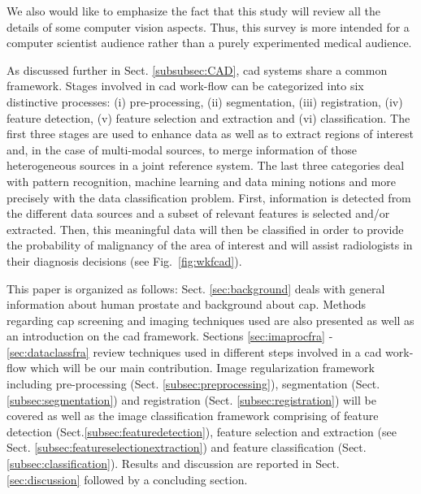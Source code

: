 {\color{red}We also would like to emphasize the fact that this study will review all the details of some computer vision aspects. Thus, this survey is more intended for a computer scientist audience rather than a purely experimented medical audience.}

As discussed further in Sect. \ref{subsubsec:CAD}, \acs{cad} systems share a common framework. Stages involved in \acs{cad} work-flow can be categorized into six distinctive processes: (i) pre-processing, (ii) segmentation, (iii) registration, (iv) feature detection, (v) feature selection and extraction and (vi) classification. The first three stages are used to enhance data as well as to extract regions of interest and, in the case of multi-modal sources, to merge information of those heterogeneous sources in a joint reference system. The last three categories deal with pattern recognition, machine learning and data mining notions and more precisely with the data classification problem. First, information is detected from the different data sources and a subset of relevant features is selected and/or extracted. Then, this meaningful data will then be classified in order to provide the probability of malignancy of the area of interest and will assist radiologists in their diagnosis decisions (see Fig.~\ref{fig:wkfcad}).

This paper is organized as follows: Sect. \ref{sec:background} deals with general information about human prostate and background about \ac{cap}. Methods regarding \ac{cap} screening and imaging techniques used are also presented as well as an introduction on the \acs{cad} framework. Sections \ref{sec:imaprocfra} - \ref{sec:dataclassfra} review techniques used in different steps involved in a \acs{cad} work-flow which will be our main contribution. Image regularization framework including pre-processing (Sect. \ref{subsec:preprocessing}), segmentation (Sect. \ref{subsec:segmentation}) and registration (Sect. \ref{subsec:registration}) will be covered as well as the image classification framework comprising of feature detection (Sect.\ref{subsec:featuredetection}), feature selection and extraction (see Sect. \ref{subsec:featureselectionextraction}) and feature classification (Sect. \ref{subsec:classification}). Results and discussion are reported in Sect. \ref{sec:discussion} followed by a concluding section.